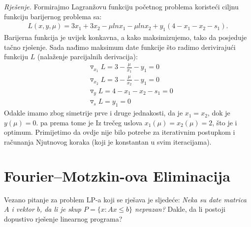 \documentclass[a4paper, utf8, 11pt, colorlinks]{book}
\begin{document}
\emph{Rješenje.}  Formirajmo Lagranžovu funkciju početnog problema koristeći ciljnu funkciju barijernog problema sa:  
\begin{align*}
   L(x, y, \mu) = 	  3 x_1 + 3 x_2 -\mu ln x_1 - \mu ln x_2 + y_1(4- x_1 - x_2 - s_1).  
\end{align*}
Barijerna funkcija je uvijek konkavna, a kako maksimizujemo,  tako da posjeduje tačno rješenje.  Sada nađimo maksimum date funkcije što radimo derivirajući funkciju $L$ (nalaženje parcijalnih derivacija):
\begin{align*}
	 &\triangledown_{x_1} L   =  3 - \frac{\mu}{x_1}  - y_1 = 0 \\
	 &\triangledown_{x_2} L   =  3 - \frac{\mu}{x_2} - y_1 = 0 \\
	 &\triangledown_{y} L   = {4-x_1-x_2 - s_1} = 0 \\
	 &\triangledown_{s} L   = { y_1} = 0 
\end{align*}
Odakle imamo zbog simetrije prve i druge jednakosti, da je  $x_1 = x_2$, dok je $y(\mu) = 0$. pa prema tome je 
Iz trečeg uslova   $x_1(\mu)=x_2(\mu)=2$, što je i optimum. Primijetimo da ovdje nije bilo potrebe za iterativnim postupkom i računanja Njutnovog koraka (koji je konstantan u svim iteracijama). 


\section{Fourier–Motzkin-ova Eliminacija}
Vezano pitanje za problem  LP-a koji se rješava  je sljedeće:
\emph{Neka su date matrica $A$ i vektor $b$, da li je skup $P = \{x: A x \leq b\}$ neprazan?} Dakle, da li postoji dopustivo rješenje linearnog programa? 
\end{document}
